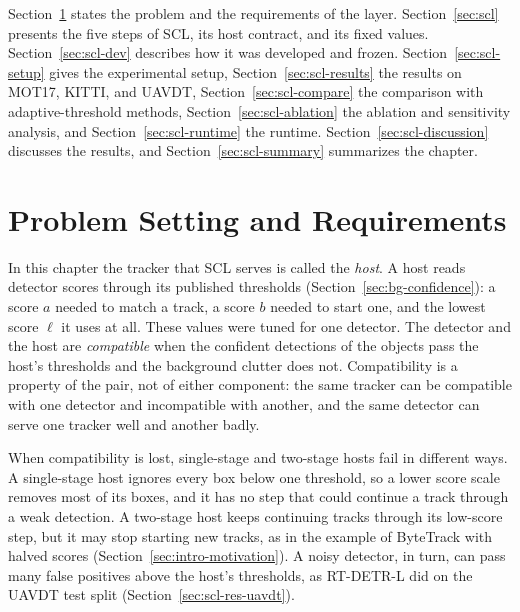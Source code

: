 Section~\ref{sec:scl-setting} states the problem and the requirements of the layer. Section~\ref{sec:scl} presents the five steps of SCL, its host contract, and its fixed values. Section~\ref{sec:scl-dev} describes how it was developed and frozen. Section~\ref{sec:scl-setup} gives the experimental setup, Section~\ref{sec:scl-results} the results on MOT17, KITTI, and UAVDT, Section~\ref{sec:scl-compare} the comparison with adaptive-threshold methods, Section~\ref{sec:scl-ablation} the ablation and sensitivity analysis, and Section~\ref{sec:scl-runtime} the runtime. Section~\ref{sec:scl-discussion} discusses the results, and Section~\ref{sec:scl-summary} summarizes the chapter.

\section{Problem Setting and Requirements}\label{sec:scl-setting}
In this chapter the tracker that SCL serves is called the \emph{host}. A host reads detector scores through its published thresholds (Section~\ref{sec:bg-confidence}): a score $a$ needed to match a track, a score $b$ needed to start one, and the lowest score $\ell$ it uses at all. These values were tuned for one detector. The detector and the host are \emph{compatible} when the confident detections of the objects pass the host's thresholds and the background clutter does not. Compatibility is a property of the pair, not of either component: the same tracker can be compatible with one detector and incompatible with another, and the same detector can serve one tracker well and another badly.

When compatibility is lost, single-stage and two-stage hosts fail in different ways. A single-stage host ignores every box below one threshold, so a lower score scale removes most of its boxes, and it has no step that could continue a track through a weak detection. A two-stage host keeps continuing tracks through its low-score step, but it may stop starting new tracks, as in the example of ByteTrack with halved scores (Section~\ref{sec:intro-motivation}). A noisy detector, in turn, can pass many false positives above the host's thresholds, as RT-DETR-L did on the UAVDT test split (Section~\ref{sec:scl-res-uavdt}).

